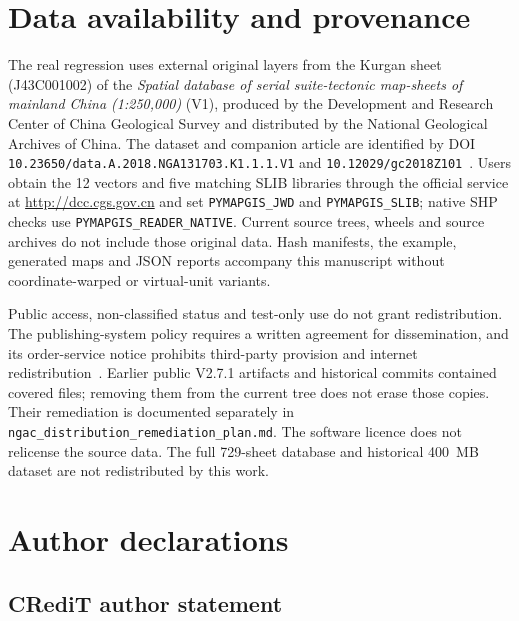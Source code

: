 \documentclass[preprint,12pt,numbers]{elsarticle}
\begin{document}

\section{Data availability and provenance}

The real regression uses external original layers from the Kurgan sheet (J43C001002) of the \emph{Spatial database of serial suite-tectonic map-sheets of mainland China (1:250,000)} (V1), produced by the Development and Research Center of China Geological Survey and distributed by the National Geological Archives of China. The dataset and companion article are identified by DOI \texttt{10.23650/data.A.2018.NGA131703.K1.1.1.V1} and \texttt{10.12029/gc2018Z101}~\cite{dataset2018,datasetpaper2018}. Users obtain the 12 vectors and five matching SLIB libraries through the official service at \url{http://dcc.cgs.gov.cn} and set \texttt{PYMAPGIS\_JWD} and \texttt{PYMAPGIS\_SLIB}; native SHP checks use \texttt{PYMAPGIS\_READER\_NATIVE}. Current source trees, wheels and source archives do not include those original data. Hash manifests, the example, generated maps and JSON reports accompany this manuscript without coordinate-warped or virtual-unit variants.

Public access, non-classified status and test-only use do not grant redistribution. The publishing-system policy requires a written agreement for dissemination, and its order-service notice prohibits third-party provision and internet redistribution~\cite{ngacsharing2017,ngacorder,ngacpolicy}. Earlier public V2.7.1 artifacts and historical commits contained covered files; removing them from the current tree does not erase those copies. Their remediation is documented separately in \texttt{ngac\_distribution\_remediation\_plan.md}. The software licence does not relicense the source data. The full 729-sheet database and historical 400~MB dataset are not redistributed by this work.


\section{Author declarations}

\subsection*{CRediT author statement}
\end{document}
